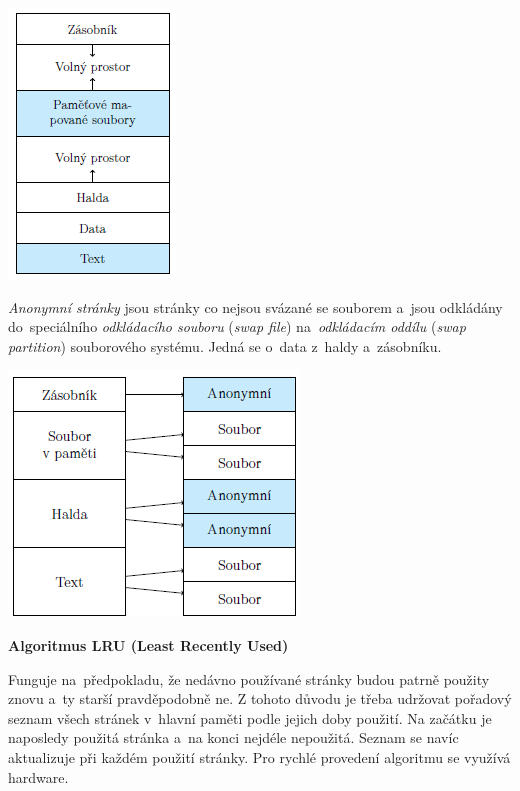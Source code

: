 \begin{center}
    \includegraphics[scale=1]{images/mem_page_file.png}
\end{center}

\emph{Anonymní stránky} jsou stránky co nejsou svázané se souborem a~jsou odkládány do~speciálního \emph{odkládacího souboru} (\emph{swap file}) na~\emph{odkládacím oddílu} (\emph{swap partition}) souborového systému. Jedná se o~data z~haldy a~zásobníku.

\begin{center}
    \includegraphics[scale=1]{images/mem_page_anon.png}
\end{center}

\begin{Large}
    \vspace{0,5cm}
    \textbf{Algoritmus LRU (Least Recently Used)}
\end{Large}

Funguje na~předpokladu, že nedávno používané stránky budou patrně použity znovu a~ty starší pravděpodobně ne. Z tohoto důvodu je třeba udržovat pořadový seznam všech stránek v~hlavní paměti podle jejich doby použití. Na začátku je naposledy použitá stránka a~na konci nejdéle nepoužitá. Seznam se navíc aktualizuje při každém použití stránky. Pro rychlé provedení algoritmu se využívá hardware.

